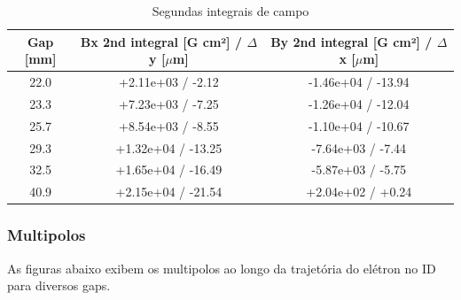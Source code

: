 \documentclass[a4paper,12pt]{article}
\begin{document}
\begin{table}[H]
\centering
\caption{Segundas integrais de campo}
\begin{tabular}{|c|c|c|}
\hline
   Gap [mm] & Bx 2nd integral [G cm²] / $\Delta$ y [$\mu$m] & By 2nd integral [G cm²] / $\Delta$ x [$\mu$m]   \\
\hline
        22.0 & +2.11e+03 / -2.12 & -1.46e+04 / -13.94 \\
        23.3 & +7.23e+03 / -7.25 & -1.26e+04 / -12.04 \\
        25.7 & +8.54e+03 / -8.55 & -1.10e+04 / -10.67 \\
        29.3 & +1.32e+04 / -13.25 & -7.64e+03 / -7.44 \\
        32.5 & +1.65e+04 / -16.49 & -5.87e+03 / -5.75 \\
        40.9 & +2.15e+04 / -21.54 & +2.04e+02 / +0.24 \\
\hline
\end{tabular}
\end{table}

\subsubsection{Multipolos}
As figuras abaixo exibem os multipolos ao longo da trajetória do elétron no ID para diversos gaps.
\end{document}
